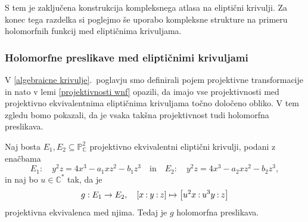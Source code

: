 \documentclass[mat1]{fmfdelo}
\numberwithin{equation}{section}
\newcommand{\C}{\mathbb C}
\newcommand{\CM}{\mathbb C ^*}
\newcommand{\PC}{\mathbb{P}^2_\C}
\newcommand{\pcoor}[1]{%
\begingroup\lccode`~=`: \lowercase{\endgroup
\edef~}{\mathbin{\mathchar\the\mathcode`:}\nobreak}%
\left[%
\begingroup
\mathcode`:=\string"8000
#1%
\endgroup
\right]%
}
\theoremstyle{definition}
\begin{document}
S tem je zaključena konstrukcija kompleksnega atlasa na eliptični krivulji. Za konec tega razdelka si poglejmo še uporabo kompleksne strukture na primeru holomorfnih funkcij med eliptičnima krivuljama.  

\subsubsection{Holomorfne preslikave med eliptičnimi krivuljami}
    V \ref{algebraicne krivulje}.\ poglavju smo definirali pojem projektivne transformacije in nato v lemi \ref{projektivnosti wnf} opazili, da imajo vse projektivnosti med projektivno ekvivalentnima eliptičnima krivuljama točno določeno obliko. V tem zgledu bomo pokazali, da je vsaka takšna projektivnost tudi holomorfna preslikava. 

\begin{trditev}
    \label{projektivnost je biholomorfizem}
    Naj bosta $E_1, E_2 \subseteq \PC$ projektivno ekvivalentni eliptični krivulji, podani z enačbama 
    \[
        E_1 : \quad y^2z = 4x^3 - a_1xz^2 - b_1z^3 \quad \text {in} \quad
        E_2 : \quad y^2z = 4x^3 - a_2xz^2 - b_2z^3,
    \]
    in naj bo $u \in \CM$ tak, da je
    \[
        g: E_1 \to E_2, \quad \pcoor{x : y : z} \mapsto \pcoor{u^2x : u^3y : z}  
    \]
    projektivna ekvivalenca med njima. Tedaj je $g$ holomorfna preslikava.  
\end{trditev}
\end{document}
